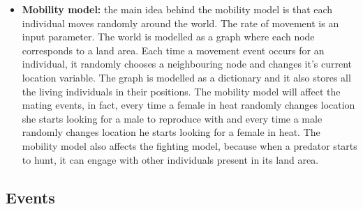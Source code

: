 \documentclass[conference]{IEEEtran}
\begin{document}
\begin{itemize}
        \item \textbf{Mobility model:} the main idea behind the mobility model is that each individual moves randomly around the world. The rate of movement is an input parameter. The world is modelled as a graph where each node corresponds to a land area. Each time a movement event occurs for an individual, it randomly chooses a neighbouring node and changes it's current location variable. The graph is modelled as a dictionary and it also stores all the living individuals in their positions. The mobility model will affect the mating events, in fact, every time a female in heat randomly changes location she starts looking for a male to reproduce with and every time a male randomly changes location he starts looking for a female in heat. The mobility model also affects the fighting model, because when a predator starts to hunt, it can engage with other individuals present in its land area. 
    \end{itemize}

\subsection{Events}
\end{document}
